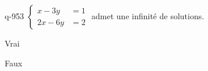 \begin{truefalse}{q-953}
$\begin{cases}x-3y &= 1 \\ 2x-6y &= 2\end{cases}$ admet une infinité de solutions.
\item* Vrai
\item Faux
\end{truefalse}

